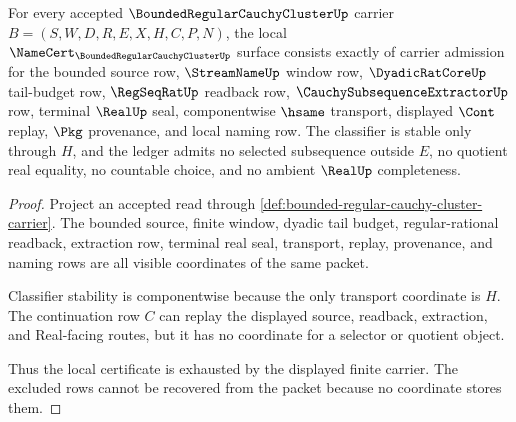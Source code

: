 \begin{theorem}
\label{thm:bounded-regular-cauchy-cluster-namecert-obligations}
For every accepted $\BoundedRegularCauchyClusterUp$ carrier $B=(S,W,D,R,E,X,H,C,P,N)$, the local $\NameCert_{\BoundedRegularCauchyClusterUp}$ surface consists exactly of carrier admission for the bounded source row, $\StreamNameUp$ window row, $\DyadicRatCoreUp$ tail-budget row, $\RegSeqRatUp$ readback row, $\CauchySubsequenceExtractorUp$ row, terminal $\RealUp$ seal, componentwise $\hsame$ transport, displayed $\Cont$ replay, $\Pkg$ provenance, and local naming row. The classifier is stable only through $H$, and the ledger admits no selected subsequence outside $E$, no quotient real equality, no countable choice, and no ambient $\RealUp$ completeness.
\end{theorem}
\begin{proof}
Project an accepted read through \autoref{def:bounded-regular-cauchy-cluster-carrier}. The bounded source, finite window, dyadic tail budget, regular-rational readback, extraction row, terminal real seal, transport, replay, provenance, and naming rows are all visible coordinates of the same packet.

Classifier stability is componentwise because the only transport coordinate is $H$. The continuation row $C$ can replay the displayed source, readback, extraction, and Real-facing routes, but it has no coordinate for a selector or quotient object.

Thus the local certificate is exhausted by the displayed finite carrier. The excluded rows cannot be recovered from the packet because no coordinate stores them.
\end{proof}

